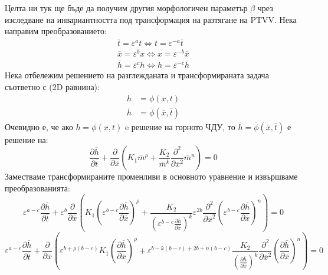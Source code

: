 Целта ни тук ще бъде да получим другия морфологичен параметър $\beta$ чрез изследване на инвариантността под трансформация на разтягане на PTVV. Нека направим преобразованието:
\[\begin{gathered}
  \overline t  = {\varepsilon ^a}t \Leftrightarrow t = {\varepsilon ^{ - a}}\overline t  \\ 
  \overline x  = {\varepsilon ^b}x \Leftrightarrow x = {\varepsilon ^{ - b}}\overline x  \\ 
  \overline h  = {\varepsilon ^c}h \Leftrightarrow h = {\varepsilon ^{ - c}}\overline h
\end{gathered} \]
Нека отбележим решението на разглежданата и трансформираната задача съответно с (2D равнина):
\begin{align*}
    h  &= \phi(x, t) \\
    \overline{h} &= \overline{\phi}(\overline{x}, \overline{t})
\end{align*}
Очевидно е, че ако $h  = \phi(x, t)$ e решение на горното ЧДУ, то $\overline{h} = \overline{\phi}(\overline{x}, \overline{t})$ е решение на:
\begin{equation*}
    \frac{\partial \overline h}{\partial \overline t} + \frac{\partial }{\partial \overline x} \left( K_{1} \overline m^{\rho} + \frac{K_2}{\overline m^k} \frac{\partial^2 }{\partial \overline x^2} \overline m ^ n \right) = 0
\end{equation*}
Заместваме трансформираните променливи в основното уравнение и извършваме преобразованията:
\begin{equation*}
    {\varepsilon ^{a - c}}\frac{{\partial \overline h }}{{\partial \overline t }} + {\varepsilon ^b}\frac{\partial }{{\partial \overline x }}\left( {{K_1}{{\left( {{\varepsilon ^{b - c}}\frac{{\partial \overline h }}{{\partial \overline x }}} \right)}^\rho } + \frac{{{K_2}}}{{{{\left( {{\varepsilon ^{b - c}}\frac{{\partial \overline h }}{{\partial \overline x }}} \right)}^k}}}{\varepsilon ^{2b}}\frac{{{\partial ^2}}}{{\partial {{\overline x }^2}}}{{\left( {{\varepsilon ^{b - c}}\frac{{\partial \overline h }}{{\partial \overline x }}} \right)}^n}} \right) = 0
\end{equation*}
\begin{equation}
   {\varepsilon ^{a - c}}\frac{{\partial \overline h }}{{\partial \overline t }} + \frac{\partial }{{\partial \overline x }}\left( {{\varepsilon ^{b + \rho (b - c)}}{K_1}{{\left( {\frac{{\partial \overline h }}{{\partial \overline x }}} \right)}^\rho } + {\varepsilon ^{b - k(b - c) + 2b + n(b - c)}}\frac{{{K_2}}}{{{{\left( {\frac{{\partial \overline h }}{{\partial \overline x }}} \right)}^k}}}\frac{{{\partial ^2}}}{{\partial {{\overline x }^2}}}{{\left( {\frac{{\partial \overline h }}{{\partial \overline x }}} \right)}^n}} \right) = 0
   \label{eq:ptvv_subst_eps}
\end{equation}

